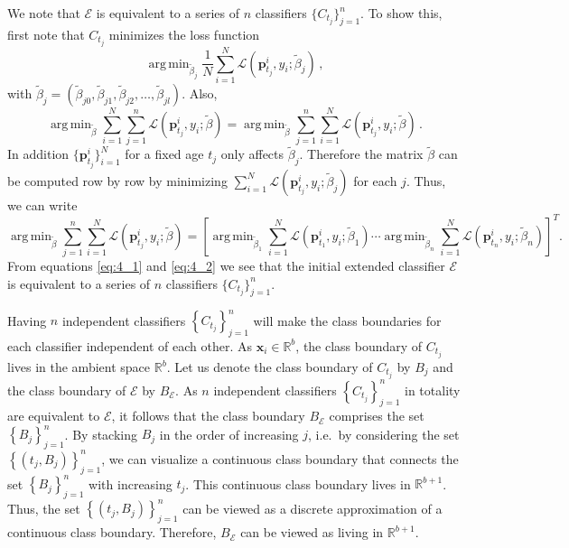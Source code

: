 \documentclass[a4paper,11pt]{article}
\DeclareMathOperator*{\argmin}{arg\,min}
\begin{document}
We note that $\mathscr{E}$ is equivalent to a series of $n$ classifiers $\{C_{t_j}\}_{j=1}^n $. To show this, first note that $C_{t_j}$ minimizes the loss function
$$
  \argmin_{\tilde{\beta}_j} \frac{1}{N} \sum_{i=1}^N \mathscr{L} ( \bm{p}^i_{t_j},y_i;\tilde{\beta}_j ) \, ,
$$
with $\tilde{\beta}_j = ( \tilde{\beta}_{j0}, \tilde{\beta}_{j1}, \tilde{\beta}_{j2}, \dots, \tilde{\beta}_{jl})$. Also,
\begin{equation}\label{eq:4_1}
	\argmin_{\tilde{\beta}} \sum_{i=1}^N \sum_{j=1}^n \mathscr{L} ( \bm{p}^i_{t_j},y_i;\tilde{\beta}) = \argmin_{\tilde{\beta}} \sum_{j=1}^n \sum_{i=1}^N \mathscr{L} ( \bm{p}^i_{t_j},y_i;\tilde{\beta} ) \, .
\end{equation}
In addition $\{\bm{p}^i_{t_j}\}_{i=1}^N$ for a fixed age $t_j$ only affects $\tilde{\beta}_j$. Therefore the matrix $\tilde{\beta}$ can be computed row by row by minimizing $\sum_{i=1}^N \mathscr{L} \left( \bm{p}^i_{t_j},y_i;\tilde{\beta}_j \right)$ for each $j$. Thus, we can write
\begin{equation}\label{eq:4_2}
	\argmin_{\tilde{\beta}} \sum_{j=1}^n \sum_{i=1}^N \mathscr{L} \left( \bm{p}^i_{t_j},y_i;\tilde{\beta} \right) = \left[\argmin_{\tilde{\beta}_1} \sum_{i=1}^N \mathscr{L} \left( \bm{p}^i_{t_1},y_i;\tilde{\beta}_1 \right) \cdots \argmin_{\tilde{\beta}_n} \sum_{i=1}^N \mathscr{L} \left( \bm{p}^i_{t_n},y_i;\tilde{\beta}_n \right) \right]^T \!\!.
\end{equation}
From equations \eqref{eq:4_1} and \eqref{eq:4_2} we see that the initial extended classifier $\mathscr{E}$ is equivalent to a series of $n$ classifiers $\{C_{t_j}\}_{j=1}^n $.

Having $n$ independent classifiers $\left\{C_{t_j}\right\}_{j=1}^n$ will make the class boundaries for each classifier independent of each other. As $\bm{x}_i \in \mathbb{R}^b$, the class boundary of $C_{t_j}$ lives in the ambient space $\mathbb{R}^{b}$. Let us denote the class boundary of $C_{t_j}$ by $B_j$ and the class boundary of $\mathscr{E}$ by $B_{\mathscr{E}}$. As $n$ independent classifiers $\left \{C_{t_j} \right \}_{j=1}^n$ in totality are equivalent to $\mathscr{E}$, it follows that the class boundary $B_{\mathscr{E}}$ comprises the set $\left\{ B_j \right\}_{j=1}^n $. By stacking $B_j$ in the order of increasing $j$, i.e.\ by considering the set $\left \{ \left(t_j, B_j \right) \right \}_{j=1}^n $, we can visualize a continuous class boundary that connects the set $\left\{ B_j \right\}_{j=1}^n$ with increasing $t_j$. This continuous class boundary lives in $\mathbb{R}^{b+1}$. Thus, the set $\left \{ \left(t_j, B_j \right) \right \}_{j=1}^n$ can be viewed as a discrete approximation of a continuous class boundary. Therefore, $B_{\mathscr{E}}$ can be viewed as living in $\mathbb{R}^{b+1}$.
\end{document}
